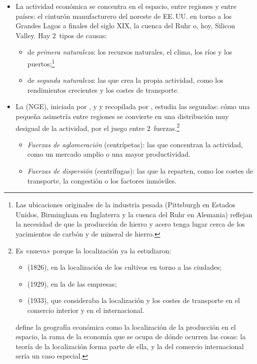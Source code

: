\documentclass[11pt]{article}
\begin{document}
\begin{itemize}
\item La actividad económica se concentra en el espacio, entre regiones y entre países: el cinturón manufacturero del noreste de EE.\,UU. en torno a los Grandes Lagos a finales del siglo XIX, la cuenca del Ruhr o, hoy, Silicon Valley. Hay 2~tipos de causas:
  \begin{itemize}
  \item de \emph{primera naturaleza}: los recursos naturales, el clima, los ríos y los puertos;\footnote{Las ubicaciones originales de la industria pesada (Pittsburgh en Estados Unidos, Birmingham en Inglaterra y la cuenca del Ruhr en Alemania) reflejan la necesidad de que la producción de hierro y acero tenga lugar cerca de los yacimientos de carbón y de mineral de hierro.}
  \item de \emph{segunda naturaleza}: las que crea la propia actividad, como los rendimientos crecientes y los costes de transporte.
  \end{itemize}
\item La  (NGE), iniciada por \textcite{Fujita1988Monopolistic}, \textcite{Krugman1991Increasing} y \textcite{Venables1996Equilibrium} y recopilada por \textcite{FujitaKrugmanVenables1999Spatial}, estudia las segundas: cómo una pequeña asimetría entre regiones se convierte en una distribución muy desigual de la actividad, por el juego entre 2~fuerzas.\footnote{Es «nueva» porque la localización ya la estudiaron:
\begin{itemize}
\item {} (1826), en la localización de los cultivos en torno a las ciudades;
\item {} (1929), en la de las empresas;
\item {} (1933), que consideraba la localización y los costes de transporte en el comercio interior y en el internacional.
\end{itemize}
\textcite{Krugman1991Geography} define la geografía económica como la localización de la producción en el espacio, la rama de la economía que se ocupa de dónde ocurren las cosas: la teoría de la localización forma parte de ella, y la del comercio internacional sería un caso especial.}
  \begin{itemize}
  \item \emph{Fuerzas de aglomeración} (centrípetas): las que concentran la actividad, como un mercado amplio o una mayor productividad.
  \item \emph{Fuerzas de dispersión} (centrífugas): las que la reparten, como los costes de transporte, la congestión o los factores inmóviles.

\end{itemize}
\end{itemize}
\end{document}
